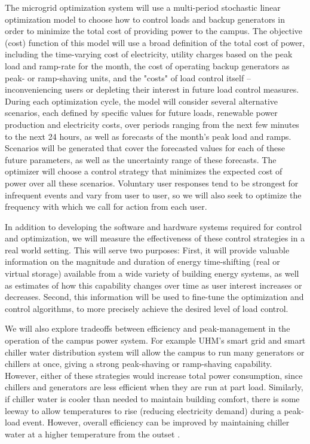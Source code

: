 The microgrid optimization system will use a multi-period stochastic
linear optimization model \cite{Kall05} to choose how to control loads and backup 
generators in order to minimize the total cost of providing power to the campus. 
The objective (cost) function of this model will use a broad definition
of the total cost of power, including the time-varying cost of electricity, 
utility charges based on the peak load and ramp-rate for the month,
the cost of operating backup generators as peak- or ramp-shaving units, 
and the "costs" of load control itself -- inconveniencing users or 
depleting their interest in future load control measures.
During each optimization cycle, the model will consider
several alternative scenarios, each defined by specific values for future
loads, renewable power production and electricity costs, over periods ranging from 
the next few minutes to the next 24 hours, as well as forecasts of the month's peak load 
and ramps. Scenarios will be generated that cover the forecasted values 
for each of these future parameters, as well as the uncertainty range of these
forecasts. The optimizer will choose a control strategy that minimizes
the expected cost of power over all these scenarios. Voluntary user responses 
tend to be strongest for infrequent events \cite{Boisvert04}
 \cite{Faruqui10, Stromback11} and vary from user to user, so we 
will also seek to optimize the frequency with which we call for action from each user.

In addition to developing the software and hardware systems required 
for control and optimization, we will measure the effectiveness of these 
control strategies in a real world setting. This will serve two purposes: 
First, it will provide valuable
information on the magnitude and duration of energy time-shifting 
(real or virtual storage) available 
from a wide variety of building energy systems, as well as estimates of how
this capability changes over time as user interest increases or decreases. 
Second, this information will be used to fine-tune the
optimization and control algorithms, to more precisely achieve the desired
level of load control.

We will also explore tradeoffs between efficiency and peak-management in the operation
of the campus power system. For example UHM's
smart grid and smart chiller water distribution system will allow the campus to
run many generators or chillers at once, giving a strong peak-shaving or
ramp-shaving capability. However, either of these strategies would increase
total power consumption, since chillers and generators are less efficient
when they are run at part load. Similarly, if chiller water is cooler than needed
to maintain building comfort, there is some leeway to allow temperatures to rise
(reducing electricity demand) during a peak-load event. However, overall 
efficiency can be improved by maintaining chiller water at a higher temperature
from the outset \cite{Motegi07}.

